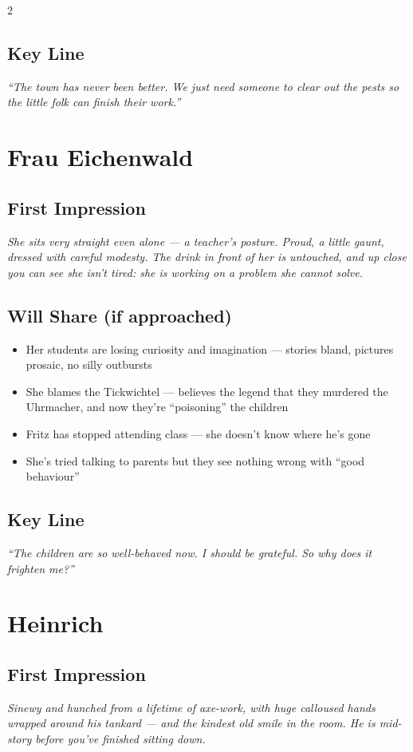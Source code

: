 \documentclass[10pt,letterpaper]{article}
\begin{document}
\begin{multicols}{2}
\subsection*{Key Line}
\textit{``The town has never been better. We just need someone to clear out the pests so the little folk can finish their work.''}

\section*{Frau Eichenwald}
\subsection*{First Impression}
\begin{readaloud}
\itshape
She sits very straight even alone --- a teacher's posture. Proud, a little gaunt, dressed with careful modesty. The drink in front of her is untouched, and up close you can see she isn't tired: she is working on a problem she cannot solve.
\end{readaloud}
\subsection*{Will Share (if approached)}
\begin{itemize}
\item Her students are losing curiosity and imagination --- stories bland, pictures prosaic, no silly outbursts
\item She blames the Tickwichtel --- believes the legend that they murdered the Uhrmacher, and now they're ``poisoning'' the children
\item Fritz has stopped attending class --- she doesn't know where he's gone
\item She's tried talking to parents but they see nothing wrong with ``good behaviour''
\end{itemize}
\subsection*{Key Line}
\textit{``The children are so well-behaved now. I should be grateful. So why does it frighten me?''}

\section*{Heinrich}
\subsection*{First Impression}
\begin{readaloud}
\itshape
Sinewy and hunched from a lifetime of axe-work, with huge calloused hands wrapped around his tankard --- and the kindest old smile in the room. He is mid-story before you've finished sitting down.
\end{readaloud}

\end{multicols}
\end{document}
